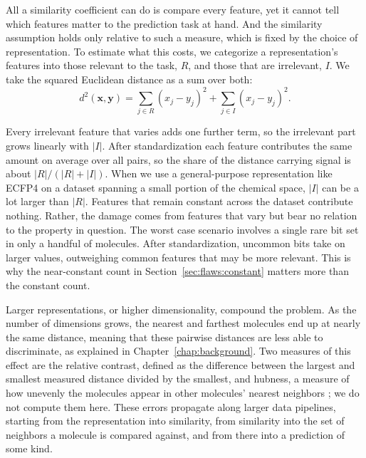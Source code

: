 

All a similarity coefficient can do is compare every feature, yet it cannot tell which features matter to the prediction task at hand. And the similarity assumption holds only relative to such a measure, which is fixed by the choice of representation. To estimate what this costs, we categorize a representation's features into those relevant to the task, $R$, and those that are irrelevant, $I$. We take the squared Euclidean distance as a sum over both:
\begin{equation}
d^2(\mathbf{x},\mathbf{y}) = \sum_{j \in R}(x_j-y_j)^2 + \sum_{j \in I}(x_j-y_j)^2 .
\label{eq:distance_split}
\end{equation}

Every irrelevant feature that varies adds one further term, so the irrelevant part grows linearly with $|I|$. After standardization each feature contributes the same amount on average over all pairs, so the share of the distance carrying signal is about $|R|/(|R|+|I|)$. When we use a general-purpose representation like ECFP4 on a dataset spanning a small portion of the chemical space, $|I|$ can be a lot larger than $|R|$. Features that remain constant across the dataset contribute nothing. Rather, the damage comes from features that vary but bear no relation to the property in question. The worst case scenario involves a single rare bit set in only a handful of molecules. After standardization, uncommon bits take on larger values, outweighing common features that may be more relevant. This is why the near-constant count in Section~\ref{sec:flaws:constant} matters more than the constant count.


Larger representations, or higher dimensionality, compound the problem. As the number of dimensions grows, the nearest and farthest molecules end up at nearly the same distance, meaning that these pairwise distances are less able to discriminate, as explained in Chapter~\ref{chap:background}. Two measures of this effect are the relative contrast, defined as the difference between the largest and smallest measured distance divided by the smallest, and hubness, a measure of how unevenly the molecules appear in other molecules' nearest neighbors \citep{Radovanovic2010}; we do not compute them here. These errors propagate along larger data pipelines, starting from the representation into similarity, from similarity into the set of neighbors a molecule is compared against, and from there into a prediction of some kind. 

